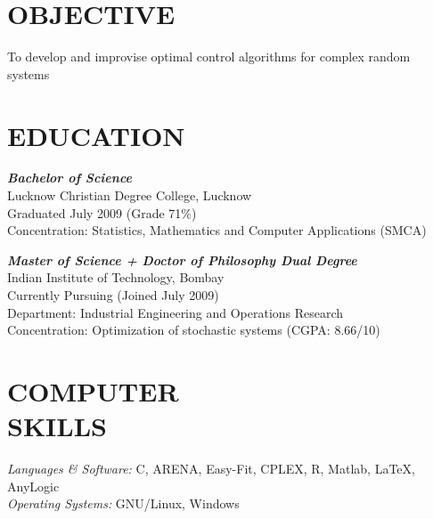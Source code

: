 \documentclass[line,margin]{res}
\begin{document}
\address{Email: manu.gupta@iitb.ac.in}
\address{manu.gupta@iitb.ac.in}
\address{http://www.ieor.iitb.ac.in/users/manu}

 
\begin{resume}
 
\section{OBJECTIVE}   To develop and improvise optimal control algorithms for complex random systems

 
 
\section{EDUCATION} {\sl \textbf{Bachelor of Science}}  \\
               Lucknow Christian Degree College, Lucknow \\
                Graduated July 2009 (Grade 71\%)\\
                Concentration: Statistics, Mathematics and Computer Applications (SMCA)

{\sl \textbf{Master of Science + Doctor of Philosophy Dual Degree}}  \\
               Indian Institute of Technology, Bombay \\
                Currently Pursuing (Joined July 2009) \\
                Department: Industrial Engineering and Operations Research\\
                Concentration: Optimization of stochastic systems (CGPA: 8.66/10)
          
  
\section{COMPUTER \\ SKILLS} {\sl Languages \& Software:} C, ARENA, Easy-Fit, CPLEX, R, Matlab, \LaTeX, AnyLogic \\
                {\sl Operating Systems:} GNU/Linux, Windows
                

\end{resume}
\end{document}
